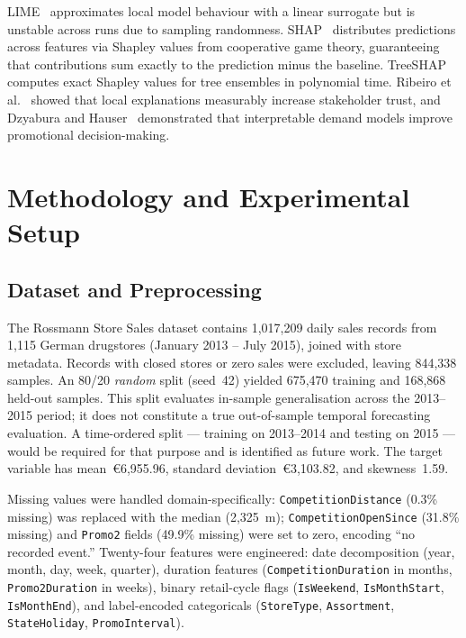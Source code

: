 \documentclass[conference]{IEEEtran}
\begin{document}
LIME~\cite{ribeiro2016} approximates local model behaviour with a linear surrogate but is unstable across runs due to sampling randomness. SHAP~\cite{lundberg2017} distributes predictions across features via Shapley values from cooperative game theory, guaranteeing that contributions sum exactly to the prediction minus the baseline. TreeSHAP~\cite{lundberg2020} computes exact Shapley values for tree ensembles in polynomial time. Ribeiro et al.~\cite{ribeiro2016} showed that local explanations measurably increase stakeholder trust, and Dzyabura and Hauser~\cite{dzyabura2019} demonstrated that interpretable demand models improve promotional decision-making.

\section{Methodology and Experimental Setup}
\label{sec:method}

\subsection{Dataset and Preprocessing}

The Rossmann Store Sales dataset contains 1,017,209 daily sales records from 1,115 German drugstores (January 2013 -- July 2015), joined with store metadata. Records with closed stores or zero sales were excluded, leaving 844,338 samples. An 80/20 \emph{random} split (seed~42) yielded 675,470 training and 168,868 held-out samples. This split evaluates in-sample generalisation across the 2013--2015 period; it does not constitute a true out-of-sample temporal forecasting evaluation. A time-ordered split — training on 2013--2014 and testing on 2015 — would be required for that purpose and is identified as future work. The target variable has mean~\euro6,955.96, standard deviation~\euro3,103.82, and skewness~1.59.

Missing values were handled domain-specifically: \texttt{CompetitionDistance} (0.3\% missing) was replaced with the median (2,325~m); \texttt{CompetitionOpenSince} (31.8\% missing) and \texttt{Promo2} fields (49.9\% missing) were set to zero, encoding ``no recorded event.'' Twenty-four features were engineered: date decomposition (year, month, day, week, quarter), duration features (\texttt{CompetitionDuration} in months, \texttt{Promo2Duration} in weeks), binary retail-cycle flags (\texttt{IsWeekend}, \texttt{IsMonthStart}, \texttt{IsMonthEnd}), and label-encoded categoricals (\texttt{StoreType}, \texttt{Assortment}, \texttt{StateHoliday}, \texttt{PromoInterval}).
\end{document}
